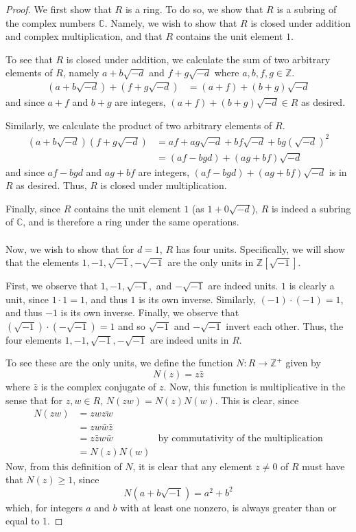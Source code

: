 \documentclass[12pt,reqno]{amsart}
\newcommand{\Z}{\mathbb{Z}}
\newcommand{\C}{\mathbb{C}}
\begin{document}
\begin{proof}
    We first show that $R$ is a ring. To do so, we show that $R$ is a subring of
    the complex numbers $\C$. Namely, we wish to show that $R$ is closed under
    addition and complex multiplication, and that $R$ contains the unit element
    $1$.

    To see that $R$ is closed under addition, we calculate the sum of two
    arbitrary elements of $R$, namely $a+b\sqrt{-d}$ and $f+g\sqrt{-d}$ where
    $a,b,f,g\in\Z$.
    \[
\begin{aligned}
    (a+b\sqrt{-d}) + (f+g\sqrt{-d}) &= (a+f) + (b+g)\sqrt{-d}
\end{aligned}
    \]
    and since $a+f$ and $b+g$ are integers, $(a+f)+(b+g)\sqrt{-d}\in R$ as
    desired.

    Similarly, we calculate the product of two arbitrary elements of $R$.
    \[
\begin{aligned}
    (a+b\sqrt{-d})(f+g\sqrt{-d}) &= af + ag\sqrt{-d} + bf\sqrt{-d} +
    bg(\sqrt{-d})^2\\
    &= (af-bgd) + (ag+bf)\sqrt{-d}
\end{aligned}
    \]
    and since $af-bgd$ and $ag+bf$ are integers, $(af-bgd)+(ag+bf)\sqrt{-d}$ is
    in $R$ as desired. Thus, $R$ is closed under multiplication.

    Finally, since $R$ contains the unit element $1$ (as $1+0\sqrt{-d}$), $R$ is
    indeed a subring of $\C$, and is therefore a ring under the same operations.
    \\
    \\
    Now, we wish to show that for $d=1$, $R$ has four units. Specifically, we
    will show that the elements $1,-1, \sqrt{-1},-\sqrt{-1}$ are the only units
    in $\Z[\sqrt{-1}]$.

    First, we observe that $1,-1,\sqrt{-1},$ and $-\sqrt{-1}$ are indeed units.
    $1$ is clearly a unit, since $1\cdot 1 = 1$, and thus $1$ is its own
    inverse. Similarly, $(-1)\cdot(-1) = 1$, and thus $-1$ is its own inverse.
    Finally, we observe that $(\sqrt{-1})\cdot(-\sqrt{-1}) = 1$ and so
    $\sqrt{-1}$ and $-\sqrt{-1}$ invert each other. Thus, the four elements
    $1,-1,\sqrt{-1},-\sqrt{-1}$ are indeed units in $R$.

    To see these are the only units, we define the function $N:R\to\Z^+$ given
    by
    \[
        N(z) = z\bar{z}
    \]
    where $\bar{z}$ is the complex conjugate of $z$.
    Now, this function is multiplicative in the sense that for $z,w\in R$,
    $N(zw) = N(z)N(w)$. This is clear, since
    \[
\begin{aligned}
    N(zw) &= zw\overline{zw}\\
    &=zw\bar{w}\bar{z}\\
    &= z\bar{z}w\bar{w} &\text{by commutativity of the multiplication}\\
    &=N(z)N(w)
\end{aligned}
    \]
    Now, from this definition of $N$, it is clear that any element $z\neq 0$ of
    $R$ must have that $N(z)\geq 1$, since 
    \[
        N(a+b\sqrt{-1}) = a^2+b^2
    \]
    which, for integers $a$ and $b$ with at least one nonzero, is always greater
    than or equal to $1$.


\end{proof}
\end{document}
